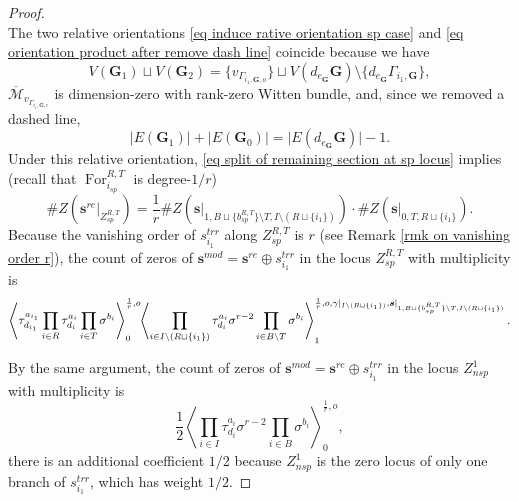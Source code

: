 \documentclass[11pt]{amsart}
\theoremstyle{definition}
\theoremstyle{remark}
\newcommand{\consta}{{\frac{1}{2}}}
\newcommand{\<}{\left<}
\renewcommand{\>}{\right>}
\numberwithin{equation}{section}
\def\Mbar{{\overline{\mathcal M}}}
\begin{document}
\begin{proof}
\begin{equation}
         \end{equation}
         The two relative orientations \eqref{eq induce rative orientation sp case} and \eqref{eq orientation product after remove dash line} coincide because we have
         $$V(\bm{G}_1)\sqcup V(\bm{G}_2)=\{v_{\Gamma_{i_1,\bm{G},o}}\}\sqcup V(d_{e_{\bm{G}}}\bm{G})\setminus \{d_{e_{\bm{G}}}\Gamma_{i_1,\bm{G}}\},$$  
         $\Mbar_{v_{\Gamma_{i_1,\bm{G},c}}}$ is dimension-zero with rank-zero Witten bundle, and, since we removed a dashed line,
         $$\lvert E(\bm{G}_1)\rvert+\lvert E(\bm{G}_0)\rvert=\lvert E(d_{e_{\bm{G}}}\bm{G})\rvert-1.$$
        Under this relative orientation, \eqref{eq split of remaining section at sp locus} implies (recall that $\operatorname{For}_{i_{sp}}^{R,T}$ is degree-$1/r$)
         $$\# Z\left( \bm{s}^{re}\vert_{Z_{sp}^{R,T}}\right)=\frac{1}{r}\#Z(\bm{s}\vert_{1,B\sqcup \{b^{R,T}_{sp}\} \setminus T,I\setminus (R\sqcup \{i_1\})})\cdot \#Z(\bm{s}\vert_{0,T,R\sqcup \{i_1\}}).$$
         Because the vanishing order of $s^{trr}_{i_1}$ along $Z_{sp}^{R,T}$ is $r$ (see Remark \ref{rmk on vanishing order r}), the count of zeros of $\bm{s}^{mod}=\bm{s}^{re}\oplus s^{trr}_{i_1}$ in the locus $Z_{sp}^{R,T}$ with multiplicity is
         \begin{equation}\label{eq trr sp terms}
             \left\langle \tau^{a_{i_1}}_{d_{i_1}}\prod_{i \in R} \tau^{a_i}_{d_i}\prod_{i\in T}\sigma^{b_i}\right\rangle^{\frac{1}{r},o}_0 \hspace{-0.1cm}\left\langle \prod_{i \in I\setminus(R\sqcup \{i_1\})} \tau^{a_i}_{d_i} \sigma^{r-2}\prod_{i\in B\setminus T}\sigma^{b_i}\right\rangle^{\frac{1}{r}, o,\gamma\vert_{I\setminus(R\sqcup \{i_1\})},\bm{s}\vert_{1,B\sqcup \{b^{R,T}_{sp}\} \setminus T,I\setminus (R\sqcup \{i_1\})}}_1.
         \end{equation}

         By the same argument, the count of zeros of $\bm{s}^{mod}=\bm{s}^{re}\oplus s^{trr}_{i_1}$ in the locus $Z_{nsp}^{1}$ with multiplicity is
         \begin{equation}\label{eq trr nsp term}
             \consta\left\langle \prod_{i\in I}\tau^{a_i}_{d_i}\sigma^{r-2}\prod_{i\in B}\sigma^{b_i}\right\rangle^{\frac{1}{r},o}_0,
         \end{equation}
         there is an additional coefficient $1/2$ because $Z_{nsp}^{1}$ is the zero locus of only one branch of $s^{trr}_{i_1}$, which has weight $1/2$.
         

\end{proof}
\end{document}
